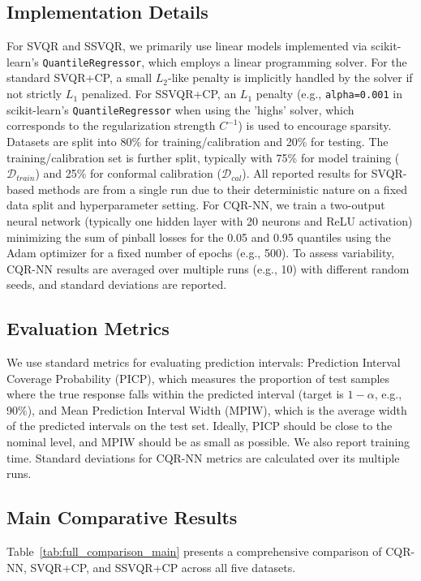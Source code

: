 \documentclass{article}
\begin{document}
\subsection{Implementation Details}
For SVQR and SSVQR, we primarily use linear models implemented via scikit-learn's \texttt{QuantileRegressor}, which employs a linear programming solver. For the standard SVQR+CP, a small $L_2$-like penalty is implicitly handled by the solver if not strictly $L_1$ penalized. For SSVQR+CP, an $L_1$ penalty (e.g., \texttt{alpha=0.001} in scikit-learn's \texttt{QuantileRegressor} when using the 'highs' solver, which corresponds to the regularization strength $C^{-1}$) is used to encourage sparsity. Datasets are split into 80\% for training/calibration and 20\% for testing. The training/calibration set is further split, typically with 75\% for model training ($\mathcal{D}_{train}$) and 25\% for conformal calibration ($\mathcal{D}_{cal}$). All reported results for SVQR-based methods are from a single run due to their deterministic nature on a fixed data split and hyperparameter setting.
For CQR-NN, we train a two-output neural network (typically one hidden layer with 20 neurons and ReLU activation) minimizing the sum of pinball losses for the 0.05 and 0.95 quantiles using the Adam optimizer for a fixed number of epochs (e.g., 500). To assess variability, CQR-NN results are averaged over multiple runs (e.g., 10) with different random seeds, and standard deviations are reported.

\subsection{Evaluation Metrics}
We use standard metrics for evaluating prediction intervals: Prediction Interval Coverage Probability (PICP), which measures the proportion of test samples where the true response falls within the predicted interval (target is $1-\alpha$, e.g., 90\%), and Mean Prediction Interval Width (MPIW), which is the average width of the predicted intervals on the test set. Ideally, PICP should be close to the nominal level, and MPIW should be as small as possible. We also report training time. Standard deviations for CQR-NN metrics are calculated over its multiple runs.

\subsection{Main Comparative Results}
Table~\ref{tab:full_comparison_main} presents a comprehensive comparison of CQR-NN, SVQR+CP, and SSVQR+CP across all five datasets.
\end{document}
